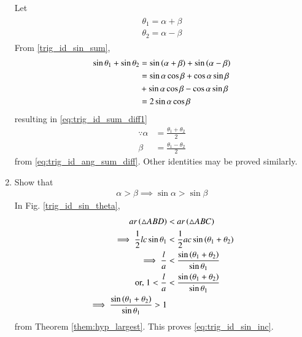 \begin{enumerate}[label=\arabic*.,ref=\thesubsection.\theenumi]
\solution Let 
%
\begin{align}
\label{eq:trig_id_ang_sum_diff}
\begin{split}
\theta_1 = \alpha + \beta
\\
\theta_2 = \alpha - \beta
\end{split}
\end{align}
%
From \eqref{trig_id_sin_sum},
%
\begin{align}
\sin \theta_1 + \sin \theta_2  &= \sin \left(\alpha + \beta\right) + \sin \left(\alpha - \beta\right)
\\
&= \sin \alpha \cos \beta + \cos \alpha \sin \beta 
\\
&+\sin \alpha \cos \beta - \cos \alpha \sin \beta
\\
&= 2 \sin \alpha \cos \beta
\end{align}
%
resulting in \eqref{eq:trig_id_sum_diff1}
%
\begin{align}
\because \alpha &= \frac{\theta_1 +\theta_2}{2}
\\
\beta &= \frac{\theta_1 -\theta_2}{2}
\end{align}
from \eqref{eq:trig_id_ang_sum_diff}.  Other identities may be proved similarly.
%
%
\item Show that 
%
\begin{align}
\label{eq:trig_id_sin_inc}
\alpha > \beta \implies \sin \alpha > \sin \beta
\end{align}
%
\solution In Fig. \ref{trig_id_sin_theta}, 	
%
\begin{align}
ar\left(\triangle ABD\right) &< ar \left(\triangle ABC\right)
\\
\implies \frac{1}{2}lc \sin \theta_1 &<  \frac{1}{2}ac \sin \left(\theta_1 + \theta_2 \right)
\\
\implies \frac{l}{a} &< \frac{\sin \left(\theta_1 + \theta_2 \right)}{\sin \theta_1}
\\
\text{or, } 1 < \frac{l}{a} &< \frac{\sin \left(\theta_1 + \theta_2 \right)}{\sin \theta_1}
\\
\implies \frac{\sin \left(\theta_1 + \theta_2 \right)}{\sin \theta_1} > 1
\end{align}
%
from Theorem \ref{them:hyp_largest}. This proves \eqref{eq:trig_id_sin_inc}.

\end{enumerate}
